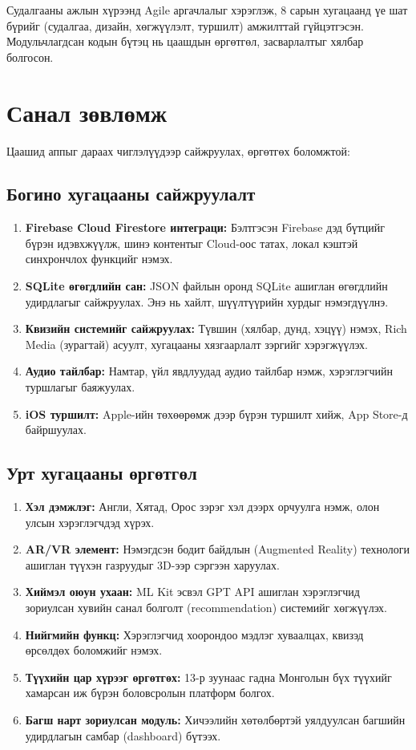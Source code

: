 Судалгааны ажлын хүрээнд Agile аргачлалыг хэрэглэж, 8 сарын хугацаанд үе шат бүрийг (судалгаа, дизайн, хөгжүүлэлт, туршилт) амжилттай гүйцэтгэсэн. Модульчлагдсан кодын бүтэц нь цаашдын өргөтгөл, засварлалтыг хялбар болгосон.

\section{Санал зөвлөмж}

Цаашид аппыг дараах чиглэлүүдээр сайжруулах, өргөтгөх боломжтой:

\subsection{Богино хугацааны сайжруулалт}

\begin{enumerate}
	\item \textbf{Firebase Cloud Firestore интеграци:} Бэлтгэсэн Firebase дэд бүтцийг бүрэн идэвхжүүлж, шинэ контентыг Cloud-оос татах, локал кэштэй синхрончлох функцийг нэмэх.
	\item \textbf{SQLite өгөгдлийн сан:} JSON файлын оронд SQLite ашиглан өгөгдлийн удирдлагыг сайжруулах. Энэ нь хайлт, шүүлтүүрийн хурдыг нэмэгдүүлнэ.
	\item \textbf{Квизийн системийг сайжруулах:} Түвшин (хялбар, дунд, хэцүү) нэмэх, Rich Media (зурагтай) асуулт, хугацааны хязгаарлалт зэргийг хэрэгжүүлэх.
	\item \textbf{Аудио тайлбар:} Намтар, үйл явдлуудад аудио тайлбар нэмж, хэрэглэгчийн туршлагыг баяжуулах.
	\item \textbf{iOS туршилт:} Apple-ийн төхөөрөмж дээр бүрэн туршилт хийж, App Store-д байршуулах.
\end{enumerate}

\subsection{Урт хугацааны өргөтгөл}

\begin{enumerate}
	\item \textbf{Хэл дэмжлэг:} Англи, Хятад, Орос зэрэг хэл дээрх орчуулга нэмж, олон улсын хэрэглэгчдэд хүрэх.
	\item \textbf{AR/VR элемент:} Нэмэгдсэн бодит байдлын (Augmented Reality) технологи ашиглан түүхэн газруудыг 3D-ээр сэргээн харуулах.
	\item \textbf{Хиймэл оюун ухаан:} ML Kit эсвэл GPT API ашиглан хэрэглэгчид зориулсан хувийн санал болголт (recommendation) системийг хөгжүүлэх.
	\item \textbf{Нийгмийн функц:} Хэрэглэгчид хоорондоо мэдлэг хуваалцах, квизэд өрсөлдөх боломжийг нэмэх.
	\item \textbf{Түүхийн цар хүрээг өргөтгөх:} 13-р зуунаас гадна Монголын бүх түүхийг хамарсан иж бүрэн боловсролын платформ болгох.
	\item \textbf{Багш нарт зориулсан модуль:} Хичээлийн хөтөлбөртэй уялдуулсан багшийн удирдлагын самбар (dashboard) бүтээх.
\end{enumerate}

